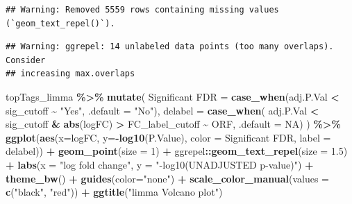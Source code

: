 \documentclass[
]{book}
\newenvironment{Shaded}{\begin{snugshade}}{\end{snugshade}}
\newcommand{\AttributeTok}[1]{\textcolor[rgb]{0.13,0.29,0.53}{#1}}
\newcommand{\ConstantTok}[1]{\textcolor[rgb]{0.56,0.35,0.01}{#1}}
\newcommand{\DecValTok}[1]{\textcolor[rgb]{0.00,0.00,0.81}{#1}}
\newcommand{\FloatTok}[1]{\textcolor[rgb]{0.00,0.00,0.81}{#1}}
\newcommand{\FunctionTok}[1]{\textcolor[rgb]{0.13,0.29,0.53}{\textbf{#1}}}
\newcommand{\NormalTok}[1]{#1}
\newcommand{\OtherTok}[1]{\textcolor[rgb]{0.56,0.35,0.01}{#1}}
\newcommand{\SpecialCharTok}[1]{\textcolor[rgb]{0.81,0.36,0.00}{\textbf{#1}}}
\newcommand{\StringTok}[1]{\textcolor[rgb]{0.31,0.60,0.02}{#1}}
\begin{document}
\begin{verbatim}
## Warning: Removed 5559 rows containing missing values (`geom_text_repel()`).
\end{verbatim}

\begin{verbatim}
## Warning: ggrepel: 14 unlabeled data points (too many overlaps). Consider
## increasing max.overlaps
\end{verbatim}

\begin{Shaded}
\begin{Highlighting}[]
\NormalTok{topTags\_limma }\SpecialCharTok{\%\textgreater{}\%}
  \FunctionTok{mutate}\NormalTok{(}
    \StringTok{\textasciigrave{}}\AttributeTok{Significant FDR}\StringTok{\textasciigrave{}} \OtherTok{=} \FunctionTok{case\_when}\NormalTok{(adj.P.Val }\SpecialCharTok{\textless{}}\NormalTok{ sig\_cutoff }\SpecialCharTok{\textasciitilde{}} \StringTok{"Yes"}\NormalTok{,}
                                  \AttributeTok{.default =} \StringTok{"No"}\NormalTok{),}
    \AttributeTok{delabel =} \FunctionTok{case\_when}\NormalTok{(}
\NormalTok{      adj.P.Val }\SpecialCharTok{\textless{}}\NormalTok{ sig\_cutoff }\SpecialCharTok{\&} \FunctionTok{abs}\NormalTok{(logFC) }\SpecialCharTok{\textgreater{}}\NormalTok{ FC\_label\_cutoff }\SpecialCharTok{\textasciitilde{}}\NormalTok{ ORF,}
      \AttributeTok{.default =} \ConstantTok{NA}\NormalTok{)}
\NormalTok{  ) }\SpecialCharTok{\%\textgreater{}\%} 
  \FunctionTok{ggplot}\NormalTok{(}\FunctionTok{aes}\NormalTok{(}\AttributeTok{x=}\NormalTok{logFC, }\AttributeTok{y=}\SpecialCharTok{{-}}\FunctionTok{log10}\NormalTok{(P.Value), }\AttributeTok{color =} \StringTok{\textasciigrave{}}\AttributeTok{Significant FDR}\StringTok{\textasciigrave{}}\NormalTok{, }\AttributeTok{label =}\NormalTok{ delabel)) }\SpecialCharTok{+} 
  \FunctionTok{geom\_point}\NormalTok{(}\AttributeTok{size =} \DecValTok{1}\NormalTok{) }\SpecialCharTok{+}
\NormalTok{  ggrepel}\SpecialCharTok{::}\FunctionTok{geom\_text\_repel}\NormalTok{(}\AttributeTok{size =} \FloatTok{1.5}\NormalTok{) }\SpecialCharTok{+}
  \FunctionTok{labs}\NormalTok{(}\AttributeTok{x =} \StringTok{"log fold change"}\NormalTok{, }\AttributeTok{y =} \StringTok{"{-}log10(UNADJUSTED p{-}value)"}\NormalTok{) }\SpecialCharTok{+}
  \FunctionTok{theme\_bw}\NormalTok{() }\SpecialCharTok{+}
  \FunctionTok{guides}\NormalTok{(}\AttributeTok{color=}\StringTok{"none"}\NormalTok{) }\SpecialCharTok{+}
  \FunctionTok{scale\_color\_manual}\NormalTok{(}\AttributeTok{values =} \FunctionTok{c}\NormalTok{(}\StringTok{"black"}\NormalTok{, }\StringTok{"red"}\NormalTok{)) }\SpecialCharTok{+}
  \FunctionTok{ggtitle}\NormalTok{(}\StringTok{"limma Volcano plot"}\NormalTok{)}
\end{Highlighting}
\end{Shaded}
\end{document}
